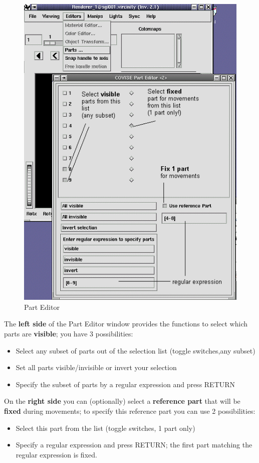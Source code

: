 \begin{itemize}
 \latexonly
 \begin{figure}[htp]
  \begin{center}
   \includegraphics[scale=0.7]{renderer/pict/partedit}
   \caption{Part Editor}
	\label{fig65}
  \end{center}
 \end{figure}
 \endlatexonly

The {\bf left side} of the Part Editor window provides the functions to select which parts 
are {\bf visible}; you have 3 possibilities:
\begin{itemize}
\item Select any subset of parts out of the selection list (toggle switches,any subset)
\item Set all parts visible/invisible or invert your selection
\item Specify the subset of parts by a regular expression and press RETURN
\end{itemize}

On the {\bf right side} you can (optionally) select a {\bf reference part} that will be 
{\bf fixed } during movements; to specify this reference part you can use 2 possibilities:
\begin{itemize}
\item Select this part from the list (toggle switches, 1 part only)
\item Specify a regular expression and press RETURN; the first part matching the 
regular expression is fixed.
\end{itemize}


\end{itemize}

